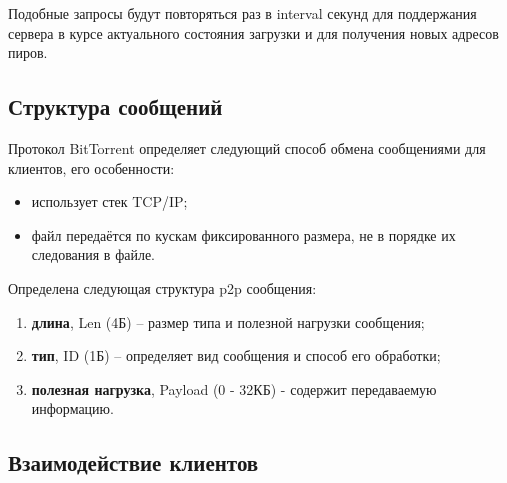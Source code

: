 Подобные запросы будут повторяться раз в interval секунд для поддержания сервера в курсе актуального состояния загрузки и для получения новых адресов пиров. \newline

\subsection{Структура сообщений}
Протокол BitTorrent определяет следующий способ обмена сообщениями для клиентов, его особенности:
\begin{itemize}
	\item использует стек TCP/IP;
	
	\item файл передаётся по кускам фиксированного размера, не в порядке их следования в файле.
\end{itemize}

Определена следующая структура p2p сообщения:
\begin{enumerate}
	\item \textbf{длина}, Len (4Б) -- размер типа и полезной нагрузки сообщения;
	
	\item \textbf{тип}, ID (1Б) -- определяет вид сообщения и способ его обработки;
	
	\item \textbf{полезная нагрузка}, Payload (0 - 32КБ) - содержит передаваемую информацию.
\end{enumerate}




\subsection{Взаимодействие клиентов}
